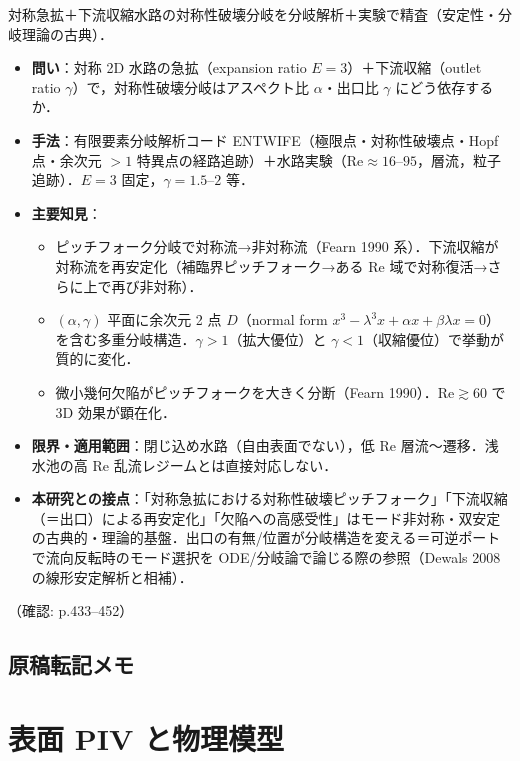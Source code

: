 \documentclass[11pt]{jsarticle}
\let\litsectionorig\section
\renewcommand{\section}{\clearpage\litsectionorig}
\newcommand{\litref}[1]{{\large\bfseries\color{citecolor}#1}}
\begin{document}
\noindent\litref{Mullin et al. (2003)}\quad 対称急拡＋下流収縮水路の対称性破壊分岐を分岐解析＋実験で精査（安定性・分岐理論の古典）．
\begin{itemize}
  \item \textbf{問い}：対称 2D 水路の急拡（expansion ratio $E=3$）＋下流収縮（outlet ratio $\gamma$）で，対称性破壊分岐はアスペクト比 $\alpha$・出口比 $\gamma$ にどう依存するか．
  \item \textbf{手法}：有限要素分岐解析コード ENTWIFE（極限点・対称性破壊点・Hopf 点・余次元 $>1$ 特異点の経路追跡）＋水路実験（$\mathrm{Re} \approx 16$--$95$，層流，粒子追跡）．$E=3$ 固定，$\gamma=1.5$--$2$ 等．
  \item \textbf{主要知見}：
  \begin{itemize}
    \item ピッチフォーク分岐で対称流→非対称流（Fearn 1990 系）．下流収縮が対称流を再安定化（補臨界ピッチフォーク→ある $\mathrm{Re}$ 域で対称復活→さらに上で再び非対称）．
    \item $(\alpha, \gamma)$ 平面に余次元 2 点 $D$（normal form $x^3 - \lambda^3 x + \alpha x + \beta\lambda x = 0$）を含む多重分岐構造．$\gamma>1$（拡大優位）と $\gamma<1$（収縮優位）で挙動が質的に変化．
    \item 微小幾何欠陥がピッチフォークを大きく分断（Fearn 1990）．$\mathrm{Re} \gtrsim 60$ で 3D 効果が顕在化．
  \end{itemize}
  \item \textbf{限界・適用範囲}：閉じ込め水路（自由表面でない），低 $\mathrm{Re}$ 層流〜遷移．浅水池の高 $\mathrm{Re}$ 乱流レジームとは直接対応しない．
  \item \textbf{本研究との接点}：「対称急拡における対称性破壊ピッチフォーク」「下流収縮（＝出口）による再安定化」「欠陥への高感受性」はモード非対称・双安定の古典的・理論的基盤．出口の有無/位置が分岐構造を変える＝可逆ポートで流向反転時のモード選択を ODE/分岐論で論じる際の参照（Dewals 2008 の線形安定解析と相補）．
\end{itemize}
\noindent（確認: p.433--452）

\subsection*{原稿転記メモ}

\section{表面 PIV と物理模型}
\end{document}
